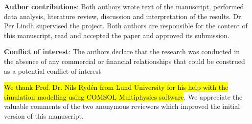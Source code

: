 \documentclass[USenglish,twocolumn]{article}
\begin{document}
\vspace{5pt}

\noindent
\textbf{Author contributions}: Both authors wrote text of the manuscript, performed data analysis, literature review, discussion and interpretation of the results. Dr. Per Lindh supervised the project. Both authors are responsible for the content of this manuscript, read and accepted the paper and approved its submission.

\vspace{5pt}

\noindent
\textbf{Conflict of interest}: The authors declare that the research was conducted in the absence of any commercial or financial relationships that could be construed as a potential conflict of interest

\begin{acknowledgement}
\hl{We thank Prof. Dr. Nils Ryd\'{e}n from Lund University for his help with the simulation modelling using COMSOL Multiphysics software}. We appreciate the valuable comments of the two anonymous reviewers which improved the initial version of this manuscript. 
\end{acknowledgement}

%


\end{document}
